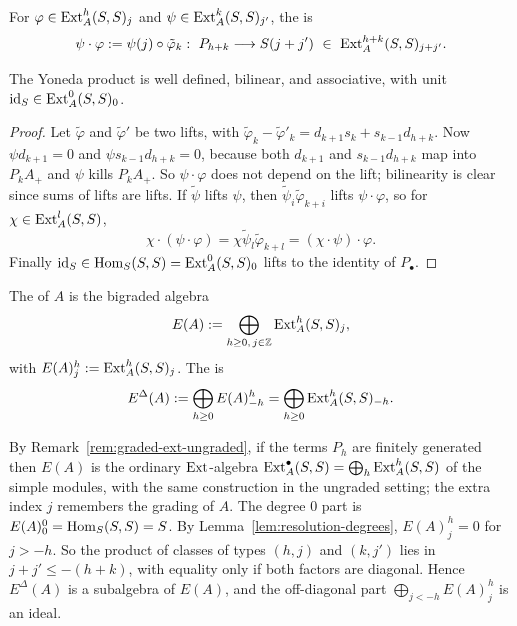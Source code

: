 \begin{definition}\label{def:yoneda-product}
For $\varphi\in\operatorname{Ext}\nolimits_A^h(S,S)_j$ and $\psi\in\operatorname{Ext}\nolimits_A^k(S,S)_{j'}$, the  is
\[
\psi\cdot\varphi:=\psi(j)\circ\tilde\varphi_k:\ P_{h+k}\longrightarrow S(j+j')\ \in\ \Ext_A^{h+k}(S,S)_{j+j'}.
\]
\end{definition}

\begin{proposition}\label{prop:yoneda-algebra}
The Yoneda product is well defined, bilinear, and associative, with unit $\operatorname{id}_S\in\operatorname{Ext}\nolimits_A^0(S,S)_0$.
\end{proposition}

\begin{proof}
Let $\tilde\varphi$ and $\tilde\varphi'$ be two lifts, with $\tilde\varphi_k-\tilde\varphi'_k=d_{k+1}s_k+s_{k-1}d_{h+k}$.
Now $\psi d_{k+1}=0$ and $\psi s_{k-1}d_{h+k}=0$, because both $d_{k+1}$ and $s_{k-1}d_{h+k}$ map into $P_kA_+$ and $\psi$ kills $P_kA_+$.
So $\psi\cdot\varphi$ does not depend on the lift; bilinearity is clear since sums of lifts are lifts.
If $\tilde\psi$ lifts $\psi$, then $\tilde\psi_i\tilde\varphi_{k+i}$ lifts $\psi\cdot\varphi$, so for $\chi\in\operatorname{Ext}\nolimits_A^l(S,S)$,
\[
\chi\cdot(\psi\cdot\varphi)=\chi\tilde\psi_l\tilde\varphi_{k+l}=(\chi\cdot\psi)\cdot\varphi.
\]
Finally $\operatorname{id}_S\in\operatorname{Hom}\nolimits_S(S,S)=\operatorname{Ext}\nolimits_A^0(S,S)_0$ lifts to the identity of $P_\bullet$.
\end{proof}

\begin{definition}\label{def:yoneda-algebra}
The  of $A$ is the bigraded algebra
\[
E(A):=\bigoplus_{h\geq0,\,j\in\mathbb{Z}}\operatorname{Ext}\nolimits_A^h(S,S)_j,
\]
with $E(A)^h_j:=\operatorname{Ext}\nolimits_A^h(S,S)_j$.
The  is
\[
E^\Delta(A):=\bigoplus_{h\geq0}E(A)^h_{-h}=\bigoplus_{h\geq0}\operatorname{Ext}\nolimits_A^h(S,S)_{-h}.
\]
\end{definition}

By Remark~\ref{rem:graded-ext-ungraded}, if the terms $P_h$ are finitely generated then $E(A)$ is the ordinary $\operatorname{Ext}\nolimits$-algebra $\operatorname{Ext}\nolimits_A^\bullet(S,S)=\bigoplus_h\operatorname{Ext}\nolimits_A^h(S,S)$ of the simple modules, with the same construction in the ungraded setting; the extra index $j$ remembers the grading of $A$.
The degree $0$ part is $E(A)^0_0=\operatorname{Hom}\nolimits_S(S,S)=S$.
By Lemma~\ref{lem:resolution-degrees}, $E(A)^h_j=0$ for $j>-h$.
So the product of classes of types $(h,j)$ and $(k,j')$ lies in $j+j'\leq-(h+k)$, with equality only if both factors are diagonal.
Hence $E^\Delta(A)$ is a subalgebra of $E(A)$, and the off-diagonal part $\bigoplus_{j<-h}E(A)^h_j$ is an ideal.

